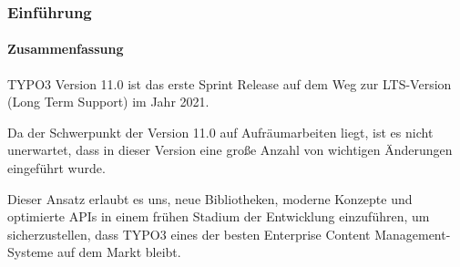 %

\begin{frame}[fragile]
	\frametitle{Einführung}
	\framesubtitle{Zusammenfassung}

	\small
		TYPO3 Version 11.0 ist das erste Sprint Release auf dem Weg zur LTS-Version
		(Long Term Support) im Jahr 2021.

		\vspace{0.2cm}

		Da der Schwerpunkt der Version 11.0 auf Aufräumarbeiten liegt, ist es nicht unerwartet,
		dass in dieser Version eine große Anzahl von wichtigen Änderungen eingeführt wurde.

		\vspace{0.2cm}

		Dieser Ansatz erlaubt es uns, neue Bibliotheken, moderne Konzepte und
		optimierte APIs in einem frühen Stadium der Entwicklung einzuführen, um sicherzustellen, dass TYPO3
		eines der besten Enterprise Content Management-Systeme auf dem Markt bleibt.

		\vspace{0.2cm}

	\normalsize

\end{frame}

